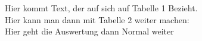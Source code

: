 Hier kommt Text, der auf sich auf Tabelle 1 Bezieht.
 \\
\newpage
Hier kann man dann mit Tabelle 2 weiter machen:
 \\
Hier geht die Auswertung dann Normal weiter
